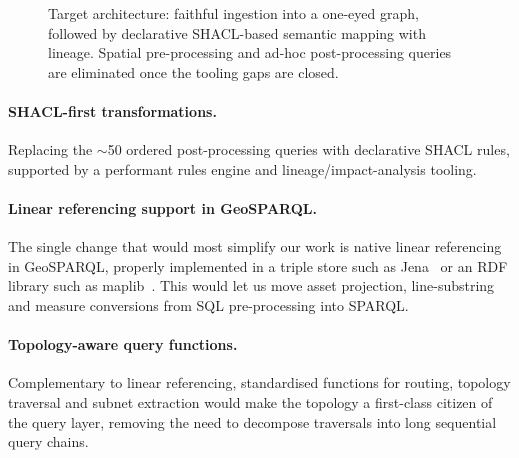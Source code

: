 \documentclass{ceurart}
\begin{document}
\begin{figure}[t]
  \centering
  \caption{Target architecture: faithful ingestion into a one-eyed graph,
    followed by declarative SHACL-based semantic mapping with lineage. Spatial
    pre-processing and ad-hoc post-processing queries are eliminated once the
    tooling gaps are closed.}
  \label{fig:future}
\end{figure}

\paragraph{SHACL-first transformations.} Replacing the $\sim$50 ordered
post-processing queries with declarative SHACL rules, supported by a performant
rules engine and lineage/impact-analysis tooling.

\paragraph{Linear referencing support in GeoSPARQL.} The single change that would
most simplify our work is native linear referencing~\cite{lrs} in GeoSPARQL,
properly implemented in a triple store such as Jena~\cite{jena} or an RDF library
such as maplib~\cite{maplib}. This would let us move asset projection,
line-substring and measure conversions from SQL pre-processing into SPARQL.

\paragraph{Topology-aware query functions.} Complementary to linear referencing,
standardised functions for routing, topology traversal and subnet extraction
would make the topology a first-class citizen of the query layer, removing the
need to decompose traversals into long sequential query chains.
\end{document}
